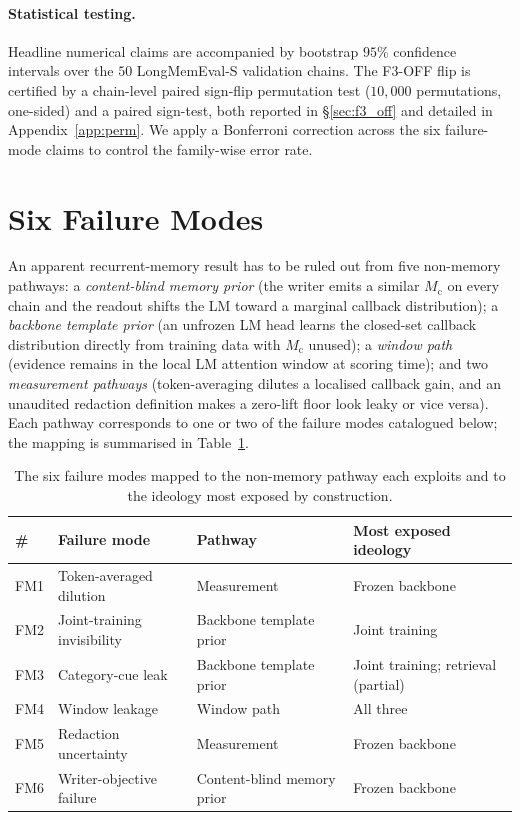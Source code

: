 \documentclass{article}
\newcommand{\Mc}{M_{\mathrm{c}}}
\begin{document}
\paragraph{Statistical testing.}  Headline numerical claims are
accompanied by bootstrap $95\%$ confidence intervals over the $50$
LongMemEval-S validation chains.  The F3-OFF flip is certified by a
chain-level paired sign-flip permutation test ($10{,}000$
permutations, one-sided) and a paired sign-test, both reported in
\S\ref{sec:f3_off} and detailed in Appendix~\ref{app:perm}.  We
apply a Bonferroni correction across the six failure-mode claims to
control the family-wise error rate.

\section{Six Failure Modes}
\label{sec:failure_modes}

An apparent recurrent-memory result has to be ruled out from five
non-memory pathways: a \emph{content-blind memory prior} (the writer
emits a similar $\Mc$ on every chain and the readout shifts the LM
toward a marginal callback distribution); a \emph{backbone template
prior} (an unfrozen LM head learns the closed-set callback
distribution directly from training data with $\Mc$ unused); a
\emph{window path} (evidence remains in the local LM attention
window at scoring time); and two \emph{measurement pathways}
(token-averaging dilutes a localised callback gain, and an unaudited
redaction definition makes a zero-lift floor look leaky or vice
versa).  Each pathway corresponds to one or two of the failure modes
catalogued below; the mapping is summarised in
Table~\ref{tab:fm_mapping}.

\begin{table}[t]
\centering
\caption{The six failure modes mapped to the non-memory pathway each
exploits and to the ideology most exposed by construction.}
\label{tab:fm_mapping}
\small
\begin{tabular}{llll}
\toprule
\# & Failure mode & Pathway & Most exposed ideology \\
\midrule
FM1 & Token-averaged dilution     & Measurement              & Frozen backbone \\
FM2 & Joint-training invisibility & Backbone template prior  & Joint training \\
FM3 & Category-cue leak           & Backbone template prior  & Joint training; retrieval (partial) \\
FM4 & Window leakage              & Window path              & All three \\
FM5 & Redaction uncertainty       & Measurement              & Frozen backbone \\
FM6 & Writer-objective failure    & Content-blind memory prior & Frozen backbone \\
\bottomrule
\end{tabular}
\end{table}
\end{document}
